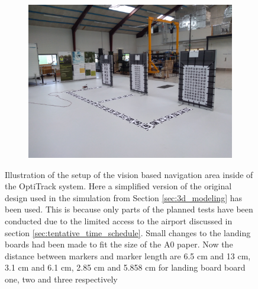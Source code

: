 \documentclass[../Head/report.tex]{subfiles}
\begin{document}
\begin{figure}[H]
    \begin{subfigure}[t]{.30\textwidth}
        \centering
        \includegraphics[width=\textwidth]{../Figures/optitrack/optitrack_right.jpg}
        \caption{}
        \label{fig:optitrack_right}
    \end{subfigure}
    \caption{Illustration of the setup of the vision based navigation area inside of the OptiTrack system. Here a simplified version of the original design used in the simulation from Section \ref{sec:3d_modeling} has been used. This is because only parts of the planned tests have been conducted due to the limited access to the airport discussed in section \ref{sec:tentative_time_schedule}. Small changes to the landing boards had been made to fit the size of the A0 paper. Now the distance between markers and marker length are 6.5 cm and 13 cm, 3.1 cm and 6.1 cm, 2.85 cm and 5.858 cm for landing board board one, two and three respectively}   
    \label{fig:optitrack_setup}
\end{figure}    
\end{document}
